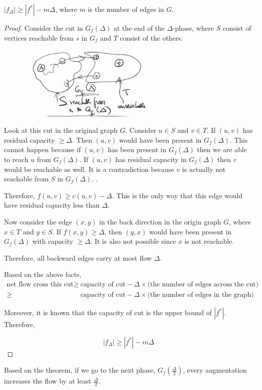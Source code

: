 \begin{theorem}
	$|f_{\Delta}| \ge |f^*| -m\Delta$, where $m$ is the number of edges in $G$.
\end{theorem}
\begin{proof}
	Consider the cut in $G_f(\Delta)$ at the end of the $\Delta$-phase, where $S$ consist of vertices reachable from $s$ in $G_f$ and $T$ consist of the others.
	\begin{figure}[H]
		\centering
		\includegraphics[width=0.6\textwidth]{fig/gf-delta.png}
	\end{figure}
	Look at this cut in the original graph $G$. Consider $u \in S$ and $v \in T$. If $(u, v)$ has residual capacity $\ge \Delta$. Then $(u, v)$ would have been present in $G_f(\Delta)$. This cannot happen because if $(u, v)$ has been present in $G_f(\Delta)$ then we are able to reach $u$ from $G_f(\Delta)$. If $(u, v)$ has residual capacity in $G_f(\Delta)$ then $v$ would be reachable as well. It is a contradiction because $v$ is actually not reachable from $S$ in $G_f(\Delta)$. .
	
	Therefore, $f(u,v) \ge c(u, v) - \Delta$. This is the only way that this edge would have residual capacity less than $\Delta$. 
	
	Now consider the edge $(x, y)$ in the back direction in the origin graph $G$, where $x \in T$ and $y \in S$. If $f(x, y) \ge \Delta$, then $(y, x)$ would have been present in $G_f(\Delta)$ with capacity $\ge \Delta$. It is also not possible since $x$ is not reachable. 
	
	Therefore, all backward edges carry at most flow $\Delta$.
	
	Based on the above facts, 
	\begin{align*}
		\text{net flow cross this cut} 
		\ge& \text{capacity of cut} - \Delta \times \text{(the number of edges across the cut)}\\
		\ge& \text{capacity of cut} - \Delta \times \text{(the number of edges in the graph)}
	\end{align*}
	
	Moreover, it is known that the capacity of cut is the upper bound of $|f^*|$. Therefore,
	
	\[|f_{\Delta}| \ge |f^*| - m\Delta\]	
\end{proof}
Based on the theorem, if we go to the next phase, $G_f(\frac{\Delta}{2})$, every augmentation increases the flow by at least $\frac{\Delta}{2}$. 

